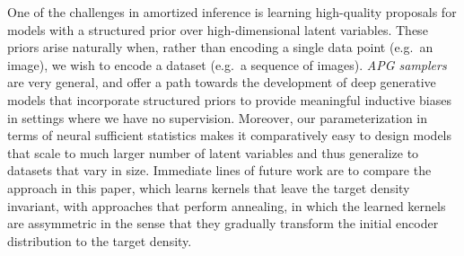 \documentclass[anonymous=false, %
               format=acmsmall, %
               review=true, %
               screen=true, %
               nonacm=true]{acmart}
\theoremstyle{definition}
\begin{document}

One of the challenges in amortized inference is learning high-quality proposals for models with a structured prior over high-dimensional latent variables. These priors arise naturally when, rather than encoding a single data point (e.g.~an image), we wish to encode a dataset (e.g.~a sequence of images). 
\emph{APG samplers} are very general, and offer a path towards the development of deep generative models that incorporate structured priors to provide meaningful inductive biases in settings where we have no supervision. 
Moreover, our parameterization in terms of neural sufficient statistics makes it comparatively easy to design models that scale to much larger number of latent variables and thus generalize to datasets that vary in size. 
Immediate lines of future work are to compare the approach in this paper, which learns kernels that leave the target density invariant, with approaches that perform annealing, in which the learned kernels are assymmetric in the sense that they gradually transform the initial encoder distribution to the target density. 

\end{document}
